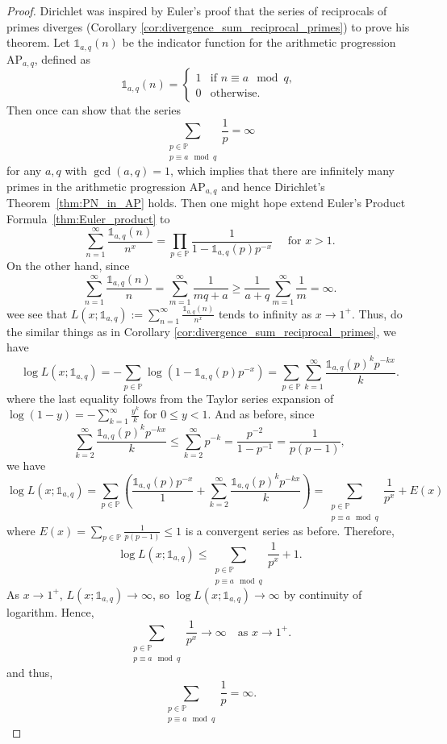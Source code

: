 \documentclass{elegantbook}
\begin{document}
\begin{proof}
  Dirichlet was inspired by Euler's proof that the series of reciprocals of primes diverges (Corollary \ref{cor:divergence_sum_reciprocal_primes}) to prove his theorem. Let $\mathds{1}_{a,q}(n)$ be the indicator function for the arithmetic progression $\mathrm{AP}_{a,q}$, defined as
  \[
    \mathds{1}_{a,q}(n) = \begin{cases} 1 & \text{if } n \equiv a \mod q, \\ 0 & \text{otherwise}. \end{cases}
  \]
  Then once can show that the series
  \[
    \sum_{\substack{p \in \mathbb{P} \\ p \equiv a \mod q}} \frac{1}{p} = \infty
  \]
  for any $a, q$ with $\gcd(a, q) = 1$, which implies that there are infinitely many primes in the arithmetic progression $\mathrm{AP}_{a,q}$ and hence Dirichlet's Theorem~\ref{thm:PN_in_AP} holds. Then one might hope extend Euler's Product Formula~\ref{thm:Euler_product} to
  \[
    \sum_{n=1}^{\infty} \frac{\mathds{1}_{a,q}(n)}{n^x} = \prod_{p\in \mathbb{P}} \frac{1}{1 - \mathds{1}_{a,q}(p) p^{-x}} \quad \text{ for } x > 1.
  \]
  On the other hand, since
  \[
    \sum_{n=1}^{\infty} \frac{\mathds{1}_{a,q}(n)}{n} = \sum_{m=1}^{\infty} \frac{1}{mq + a} \geq \frac{1}{a+q}\sum_{m=1}^{\infty} \frac{1}{m} = \infty.
  \]
  wee see that $L(x;\mathds{1}_{a,q}):= \sum_{n=1}^{\infty} \frac{\mathds{1}_{a,q}(n)}{n^x}$ tends to infinity as $x \to 1^+$. Thus, do the similar things as in Corollary \ref{cor:divergence_sum_reciprocal_primes}, we have
  \[
    \log L(x;\mathds{1}_{a,q}) = -\sum_{p \in \mathbb{P}} \log(1 - \mathds{1}_{a,q}(p) p^{-x}) = \sum_{p \in \mathbb{P}} \sum_{k=1}^{\infty} \frac{\mathds{1}_{a,q}(p)^k p^{-kx}}{k}.
  \]
  where the last equality follows from the Taylor series expansion of $\log(1 - y) = -\sum_{k=1}^{\infty} \frac{y^k}{k}$ for $0 \leq y < 1$. And as before, since
  \[
    \sum_{k=2}^{\infty} \frac{\mathds{1}_{a,q}(p)^k p^{-kx}}{k} \leq \sum_{k=2}^{\infty} p^{-k} = \frac{p^{-2}}{1 - p^{-1}} = \frac{1}{p(p-1)},
  \]
  we have
  \begin{equation} \label{eq:log_L_function_AP_idea}
    \log L(x;\mathds{1}_{a,q}) = \sum_{p \in \mathbb{P}} \left( \frac{\mathds{1}_{a,q}(p) p^{-x}}{1} + \sum_{k=2}^{\infty} \frac{\mathds{1}_{a,q}(p)^k p^{-kx}}{k} \right) = \sum_{\substack{p \in \mathbb{P} \\ p \equiv a \mod q}} \frac{1}{p^x} + E(x)
  \end{equation}
  where $E(x) = \sum_{p \in \mathbb{P}} \frac{1}{p(p-1)}\leq 1$ is a convergent series as before. Therefore,
  \[
    \log L(x;\mathds{1}_{a,q}) \leq \sum_{\substack{p \in \mathbb{P} \\ p \equiv a \mod q}} \frac{1}{p^x} + 1.
  \]
  As $x \to 1^+$, $L(x;\mathds{1}_{a,q}) \to \infty$, so $\log L(x;\mathds{1}_{a,q}) \to \infty$ by continuity of logarithm. Hence,
  \[
    \sum_{\substack{p \in \mathbb{P} \\ p \equiv a \mod q}} \frac{1}{p^x} \to \infty \quad \text{as } x \to 1^+.
  \]
  and thus,
  \[
    \sum_{\substack{p \in \mathbb{P} \\ p \equiv a \mod q}} \frac{1}{p} = \infty.
  \]
\end{proof}
\end{document}
